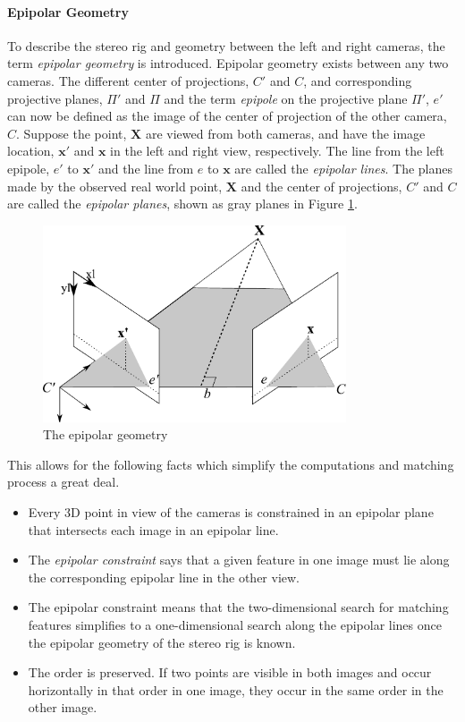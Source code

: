 \paragraph{Epipolar Geometry}
To describe the stereo rig and geometry between the left and right cameras, the term
\emph{epipolar geometry} is introduced. Epipolar geometry exists between any two cameras.
The different center of projections, $C'$ and $C$, and corresponding
projective planes, $\Pi'$ and $\Pi$ and the term \emph{epipole} on the projective plane
$\Pi'$, $e'$ can now be defined as the image of the center of projection of the other 
camera, $C$. Suppose the point, $\mathbf{X}$ are viewed from both cameras, and have the image
location, $\mathbf{x'}$ and $\mathbf{x}$ in the left and right view, respectively. The line from the left
epipole, $e'$ to $\mathbf{x'}$ and the line from $e$ to $\mathbf{x}$ are called the \emph{epipolar
lines}. The planes made by the observed real world point, $\mathbf{X}$ and the center of
projections, $C'$ and $C$ are called the \emph{epipolar planes}, shown as gray planes in Figure
\ref{chap2:fig-epipolarGeometry}.
\begin{figure}[htbp]
    \centering
    \includegraphics[width=0.8\textwidth]{pics/epipolar}
    \caption{The epipolar geometry}
    \label{chap2:fig-epipolarGeometry}
\end{figure}

This allows for the following facts which simplify the computations and matching process
a great deal. 
\cite{epipolar}
\begin{itemize}
    \item Every 3D point in view of the cameras is constrained in an epipolar plane that
        intersects each image in an epipolar line.
    \item The \emph{epipolar constraint} says that a given feature in one image must lie
        along the corresponding epipolar line in the other view.
    \item The epipolar constraint means that the two-dimensional search for matching
        features simplifies to a one-dimensional search along the epipolar lines once the
        epipolar geometry of the stereo rig is known.
    \item The order is preserved. If two points are visible in both images and occur
        horizontally in that order in one image, they occur in the same order in the other
        image.
\end{itemize}


